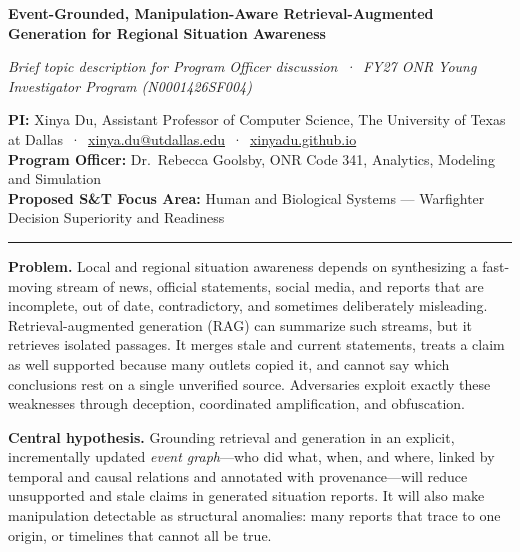 \documentclass[11pt]{article}
\newcommand{\head}[1]{{\color{navy}\textbf{#1}}\enspace}
\newcommand{\POline}{Dr.\ Rebecca Goolsby, ONR Code 341, Analytics, Modeling and Simulation}
\newcommand{\FocusArea}{Human and Biological Systems --- Warfighter Decision Superiority and Readiness}
\begin{document}
\begin{center}
{\fontsize{15.5}{18.5}\selectfont\bfseries\color{navy} Event-Grounded, Manipulation-Aware Retrieval-Augmented\\[1pt] Generation for Regional Situation Awareness\par}
\vspace{3pt}
{\small\itshape Brief topic description for Program Officer discussion \,·\, FY27 ONR Young Investigator Program (N0001426SF004)\par}
\end{center}
\vspace{-2pt}
{\small
\textbf{PI:} Xinya Du, Assistant Professor of Computer Science, The University of Texas at Dallas \,·\, \href{mailto:xinya.du@utdallas.edu}{xinya.du@utdallas.edu} \,·\, \href{https://xinyadu.github.io}{xinyadu.github.io}\\
\textbf{Program Officer:} \POline\\
\textbf{Proposed S\&T Focus Area:} \FocusArea\par}
\vspace{-3pt}
{\color{navy}\rule{\linewidth}{0.6pt}}

\head{Problem.} Local and regional situation awareness depends on synthesizing a fast-moving stream of news, official statements, social media, and reports that are incomplete, out of date, contradictory, and sometimes deliberately misleading. Retrieval-augmented generation (RAG) can summarize such streams, but it retrieves isolated passages. It merges stale and current statements, treats a claim as well supported because many outlets copied it, and cannot say which conclusions rest on a single unverified source. Adversaries exploit exactly these weaknesses through deception, coordinated amplification, and obfuscation.

\head{Central hypothesis.} Grounding retrieval and generation in an explicit, incrementally updated \emph{event graph}---who did what, when, and where, linked by temporal and causal relations and annotated with provenance---will reduce unsupported and stale claims in generated situation reports. It will also make manipulation detectable as structural anomalies: many reports that trace to one origin, or timelines that cannot all be true.
\end{document}
